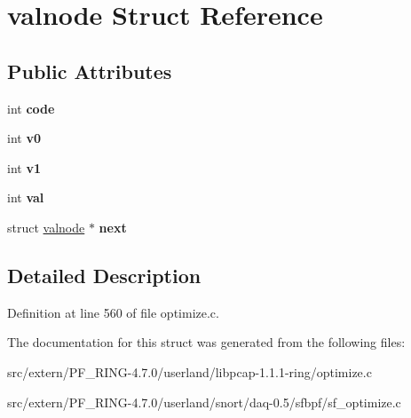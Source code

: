 \hypertarget{structvalnode}{
\section{valnode Struct Reference}
\label{structvalnode}
}
\subsection*{Public Attributes}
\begin{DoxyCompactItemize}
\item 
\hypertarget{structvalnode_a899649d1800c0c0d8387c513f970ec25}{
int {\bfseries code}}
\label{structvalnode_a899649d1800c0c0d8387c513f970ec25}

\item 
\hypertarget{structvalnode_af05a495645bdfbb631b1fef19db49566}{
int {\bfseries v0}}
\label{structvalnode_af05a495645bdfbb631b1fef19db49566}

\item 
\hypertarget{structvalnode_a0ccc06aea18a832535cacef5cd080aa1}{
int {\bfseries v1}}
\label{structvalnode_a0ccc06aea18a832535cacef5cd080aa1}

\item 
\hypertarget{structvalnode_acc48c89994e919e6aae03cef2ff829a7}{
int {\bfseries val}}
\label{structvalnode_acc48c89994e919e6aae03cef2ff829a7}

\item 
\hypertarget{structvalnode_a1cf7a0ec9dcc4158f930e2d2bb167290}{
struct \hyperlink{structvalnode}{valnode} $\ast$ {\bfseries next}}
\label{structvalnode_a1cf7a0ec9dcc4158f930e2d2bb167290}

\end{DoxyCompactItemize}


\subsection{Detailed Description}


Definition at line 560 of file optimize.c.



The documentation for this struct was generated from the following files:\begin{DoxyCompactItemize}
\item 
src/extern/PF\_\-RING-\/4.7.0/userland/libpcap-\/1.1.1-\/ring/optimize.c\item 
src/extern/PF\_\-RING-\/4.7.0/userland/snort/daq-\/0.5/sfbpf/sf\_\-optimize.c\end{DoxyCompactItemize}
